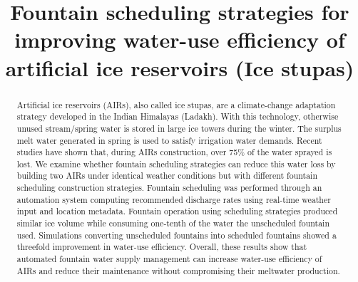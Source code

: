 \documentclass[tc, manuscript]{copernicus}
\begin{document}
\title{Fountain scheduling strategies for improving water-use efficiency of artificial ice reservoirs (Ice stupas)}

\def\Authors{Suryanarayanan Balasubramanian\,$^{1,2}$, Martin Hoelzle\,$^{1}$Roger Waser\,$^{3}$}

\def\Address{$^{1}$University of Fribourg, Department of Geosciences, Fribourg, Switzerland $^{2}$University of
Applied Sciences and Arts, Luzern, Switzerland} \def\corrAuthor{Suryanarayanan Balasubramanian}





\maketitle

\begin{abstract}

  Artificial ice reservoirs (AIRs), also called ice stupas, are a climate-change adaptation strategy
  developed in the Indian Himalayas (Ladakh). With this technology, otherwise unused stream/spring water is
  stored in large ice towers during the winter. The surplus melt water generated in spring is used to
  satisfy irrigation water demands. Recent studies have shown that, during AIRs construction, over 75\% of
  the water sprayed is lost. We examine whether fountain scheduling strategies can reduce this
  water loss by building two AIRs under identical weather conditions but with different fountain scheduling
  construction strategies. Fountain scheduling was performed through an automation system computing recommended
  discharge rates using real-time weather input and location metadata. Fountain operation using scheduling
  strategies produced similar ice volume while consuming one-tenth of the water the unscheduled fountain used.
  Simulations converting unscheduled fountains into scheduled fountains showed a threefold improvement in water-use efficiency. Overall, these results show that automated fountain water supply
  management can increase water-use efficiency of AIRs and reduce their maintenance without compromising
  their meltwater production.

\end{abstract}
\end{document}
